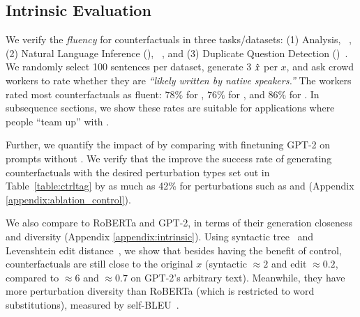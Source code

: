 \subsection{Intrinsic Evaluation}
\label{subsec:intrinsic}



We verify the \emph{fluency} for \sysname counterfactuals in three tasks/datasets: (1) \sst Analysis, \dsst~\cite{socher2013recursive},
(2) Natural Language Inference (\nli), \dnli~\cite{bowman-etal-2015-large}, and 
(3) Duplicate Question Detection (\dqqp)~\cite{wang2018glue}.
We randomly select 100 sentences per dataset, generate 3 $\hat{x}$ per $x$, and ask crowd workers to rate whether they are \emph{``likely written by native speakers.''}
The workers rated most counterfactuals as fluent: $78\%$ for \dsst, $76\%$ for \dqqp, and $86\%$ for \dnli. In subsequence sections, we show these rates are suitable for applications where people ``team up'' with \sysname.

Further, we quantify the impact of \tagstrs by comparing \sysname with finetuning GPT-2 on prompts without \tagstrshorts.
We verify that the \tagstrshorts improve the success rate of generating counterfactuals with the desired perturbation types set out in Table~\ref{table:ctrltag} by as much as 42\% for perturbations such as  and  (Appendix \ref{appendix:ablation_control}).

We also compare \sysname to RoBERTa and GPT-2, in terms of their generation closeness and diversity (Appendix \ref{appendix:intrinsic}).
Using syntactic tree~\cite{zhang1989simple} and Levenshtein edit distance~\cite{levenshtein1966binary}, we show that besides having the benefit of control, \sysname counterfactuals are still close to the original $x$ (syntactic ${\approx}2$ and edit ${\approx}0.2$, compared to ${\approx}6$ and ${\approx}0.7$ on GPT-2's arbitrary text).
Meanwhile, they have more perturbation diversity than RoBERTa (which is restricted to word substitutions), measured by self-BLEU~\cite{zhu2018texygen}.
